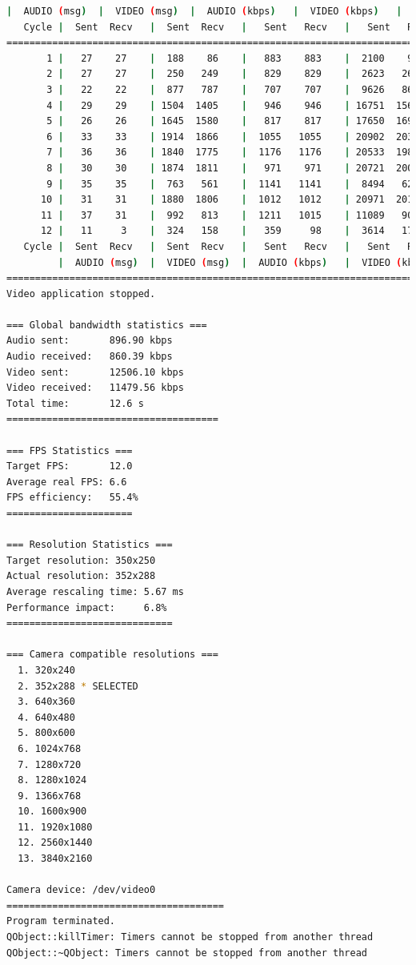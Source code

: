 \begin{lstlisting}[language=bash,basicstyle=\ttfamily\tiny]
         |  AUDIO (msg)  |  VIDEO (msg)  |  AUDIO (kbps)   |  VIDEO (kbps)   |     CPU (%) 
   Cycle |  Sent  Recv   |  Sent  Recv   |   Sent   Recv   |   Sent   Recv   | Program System
================================================================================================
       1 |   27    27    |  188    86    |   883    883    |  2100    962    |  23      0       
       2 |   27    27    |  250   249    |   829    829    |  2623   2612    |  30     78       
       3 |   22    22    |  877   787    |   707    707    |  9626   8642    |  26     75       
       4 |   29    29    | 1504  1405    |   946    946    | 16751  15650    |  31     68       
       5 |   26    26    | 1645  1580    |   817    817    | 17650  16952    |  32     68       
       6 |   33    33    | 1914  1866    |  1055   1055    | 20902  20377    |  28     68       
       7 |   36    36    | 1840  1775    |  1176   1176    | 20533  19807    |  36     71       
       8 |   30    30    | 1874  1811    |   971    971    | 20721  20024    |  38     73       
       9 |   35    35    |  763   561    |  1141   1141    |  8494   6250    |  30     72       
      10 |   31    31    | 1880  1806    |  1012   1012    | 20971  20144    |  37     71       
      11 |   37    31    |  992   813    |  1211   1015    | 11089   9088    |  45     69       
      12 |   11     3    |  324   158    |   359     98    |  3614   1762    |  17     56       
   Cycle |  Sent  Recv   |  Sent  Recv   |   Sent   Recv   |   Sent   Recv   | Program System
         |  AUDIO (msg)  |  VIDEO (msg)  |  AUDIO (kbps)   |  VIDEO (kbps)   |     CPU (%) 
===========================================================================================
Video application stopped.

=== Global bandwidth statistics ===
Audio sent:       896.90 kbps
Audio received:   860.39 kbps
Video sent:       12506.10 kbps
Video received:   11479.56 kbps
Total time:       12.6 s
=====================================

=== FPS Statistics ===
Target FPS:       12.0
Average real FPS: 6.6
FPS efficiency:   55.4%
======================

=== Resolution Statistics ===
Target resolution: 350x250
Actual resolution: 352x288
Average rescaling time: 5.67 ms
Performance impact:     6.8%
=============================

=== Camera compatible resolutions ===
  1. 320x240
  2. 352x288 * SELECTED
  3. 640x360
  4. 640x480
  5. 800x600
  6. 1024x768
  7. 1280x720
  8. 1280x1024
  9. 1366x768
  10. 1600x900
  11. 1920x1080
  12. 2560x1440
  13. 3840x2160

Camera device: /dev/video0
======================================
Program terminated.
QObject::killTimer: Timers cannot be stopped from another thread
QObject::~QObject: Timers cannot be stopped from another thread
\end{lstlisting}


